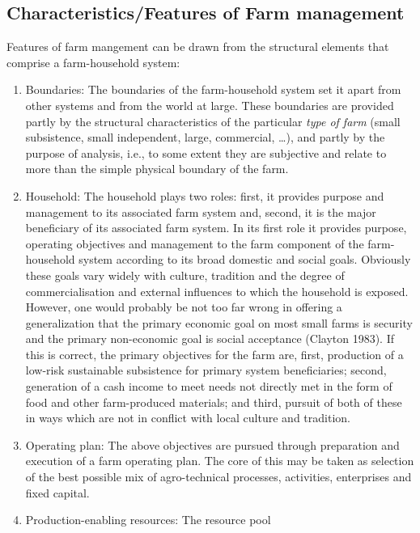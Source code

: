 \documentclass[11pt,]{book}
\theoremstyle{definition}
\theoremstyle{definition}
\theoremstyle{definition}
\theoremstyle{remark}
\begin{document}
\subsection{Characteristics/Features of Farm
management}\label{characteristicsfeatures-of-farm-management}

Features of farm mangement can be drawn from the structural elements
that comprise a farm-household system:

\begin{enumerate}
\def\labelenumi{\arabic{enumi}.}
\item
  Boundaries: The boundaries of the farm-household system set it apart
  from other systems and from the world at large. These boundaries are
  provided partly by the structural characteristics of the particular
  \emph{type of farm} (small subsistence, small independent, large,
  commercial, \ldots{}), and partly by the purpose of analysis, i.e., to
  some extent they are subjective and relate to more than the simple
  physical boundary of the farm.
\item
  Household: The household plays two roles: first, it provides purpose
  and management to its associated farm system and, second, it is the
  major beneficiary of its associated farm system. In its first role it
  provides purpose, operating objectives and management to the farm
  component of the farm-household system according to its broad domestic
  and social goals. Obviously these goals vary widely with culture,
  tradition and the degree of commercialisation and external influences
  to which the household is exposed. However, one would probably be not
  too far wrong in offering a generalization that the primary economic
  goal on most small farms is security and the primary non-economic goal
  is social acceptance (Clayton 1983). If this is correct, the primary
  objectives for the farm are, first, production of a low-risk
  sustainable subsistence for primary system beneficiaries; second,
  generation of a cash income to meet needs not directly met in the form
  of food and other farm-produced materials; and third, pursuit of both
  of these in ways which are not in conflict with local culture and
  tradition.
\item
  Operating plan: The above objectives are pursued through preparation
  and execution of a farm operating plan. The core of this may be taken
  as selection of the best possible mix of agro-technical processes,
  activities, enterprises and fixed capital.
\item
  Production-enabling resources: The resource pool

\end{enumerate}
\end{document}
